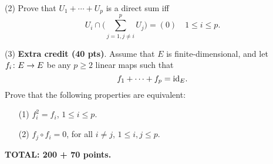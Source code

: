 \documentclass[12pt]{article}
\begin{document}
\medskip
(2)
Prove that $U_1 + \cdots + U_p$ is a direct sum iff
\[
U_i \cap \bigg(\sum_{j = 1, j \not= i}^p U_j \bigg) = (0)
\quad 1 \leq i \leq p.
\]


\medskip\noindent
(3)
{\bf Extra credit (40 pts)\/}.
Assume that $E$ is finite-dimensional, and
let $f_i\colon E\rightarrow E$ be any 
$p\geq 2$ linear maps such that
\[
f_1 + \cdots + f_p  = {\rm id}_E.
\]
Prove that the following properties are equivalent:
\begin{enumerate}
\item[(1)]
$f_i^2 = f_i$, $1\leq i \leq p$.
\item[(2)]
$f_j \circ f_i =  0$, for all $i \not= j$, $1\leq i, j \leq p$.
\end{enumerate}


\vspace{0.5cm}\noindent
{\bf TOTAL: 200  + 70 points.}
\end{document}
